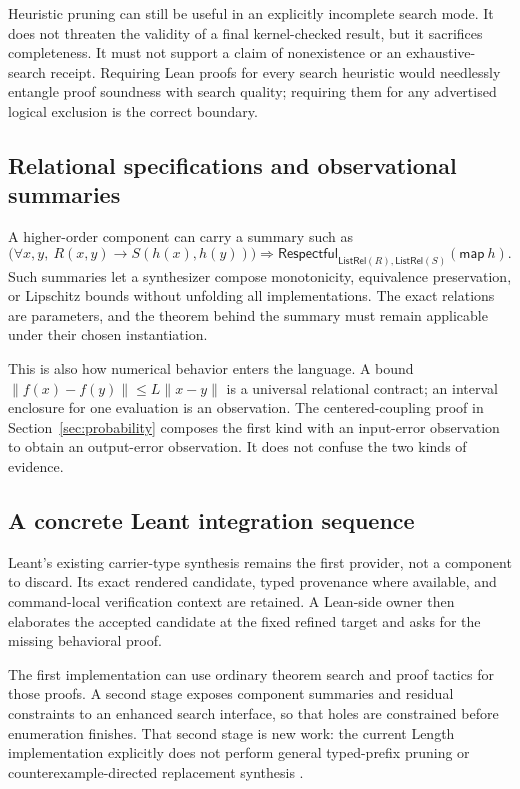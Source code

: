 \documentclass[11pt,letterpaper]{article}
\theoremstyle{definition}\newtheorem{definition}[theorem]{Definition}
\begin{document}
Heuristic pruning can still be useful in an explicitly incomplete search mode. It does not threaten the validity of a final kernel-checked result, but it sacrifices completeness. It must not support a claim of nonexistence or an exhaustive-search receipt. Requiring Lean proofs for every search heuristic would needlessly entangle proof soundness with search quality; requiring them for any advertised logical exclusion is the correct boundary.

\subsection{Relational specifications and observational summaries}
A higher-order component can carry a summary such as
\[
 \bigl(\forall x,y,\ R(x,y)\to S(h(x),h(y))\bigr)
 \Longrightarrow
 \mathsf{Respectful}_{\mathsf{ListRel}(R),\mathsf{ListRel}(S)}
       (\mathsf{map}\ h).
\]
Such summaries let a synthesizer compose monotonicity, equivalence preservation, or Lipschitz bounds without unfolding all implementations. The exact relations are parameters, and the theorem behind the summary must remain applicable under their chosen instantiation.

This is also how numerical behavior enters the language. A bound
$\|f(x)-f(y)\|\le L\|x-y\|$ is a universal relational contract; an interval enclosure for one evaluation is an observation. The centered-coupling proof in Section~\ref{sec:probability} composes the first kind with an input-error observation to obtain an output-error observation. It does not confuse the two kinds of evidence.

\subsection{A concrete Leant integration sequence}
Leant's existing carrier-type synthesis remains the first provider, not a component to discard. Its exact rendered candidate, typed provenance where available, and command-local verification context are retained. A Lean-side owner then elaborates the accepted candidate at the fixed refined target and asks for the missing behavioral proof.

The first implementation can use ordinary theorem search and proof tactics for those proofs. A second stage exposes component summaries and residual constraints to an enhanced search interface, so that holes are constrained before enumeration finishes. That second stage is new work: the current Length implementation explicitly does not perform general typed-prefix pruning or counterexample-directed replacement synthesis \cite{leantLength}.
\end{document}
